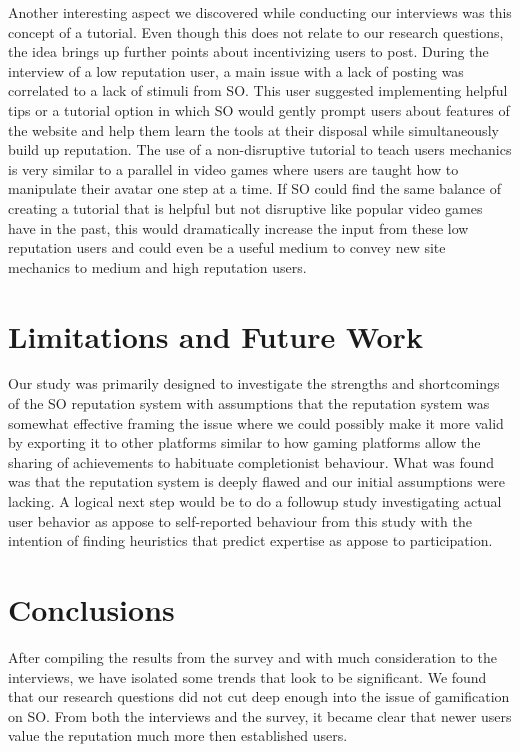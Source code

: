 \documentclass{sigchi}
\begin{document}
Another interesting aspect we discovered while conducting our interviews was this concept of a tutorial. Even though this does not relate to our research questions, the idea brings up further points about incentivizing users to post. During the interview of a low reputation user, a main issue with a lack of posting was correlated to a lack of stimuli from SO. This user suggested implementing helpful tips or a tutorial option in which SO would gently prompt users about features of the website and help them learn the tools at their disposal while simultaneously build up reputation. The use of a non-disruptive tutorial to teach users mechanics is very similar to a parallel in video games where users are taught how to manipulate their avatar one step at a time. If SO could find the same balance of creating a tutorial that is helpful but not disruptive like popular video games have in the past, this would dramatically increase the input from these low reputation users and could even be a useful medium to convey new site mechanics to medium and high reputation users.


\section{Limitations and Future Work}

Our study was primarily designed to investigate the strengths and shortcomings of the SO reputation system with assumptions that the reputation system was somewhat effective framing the issue where we could possibly make it more valid by exporting it to other platforms similar to how gaming platforms allow the sharing of achievements to habituate completionist behaviour. What was found was that the reputation system is deeply flawed and our initial assumptions were lacking. A logical next step would be to do a followup study investigating actual user behavior as appose to self-reported behaviour from this study with the intention of finding heuristics that predict expertise as appose to participation. 

\section{Conclusions}

After compiling the results from the survey and with much consideration to the interviews, we have isolated some trends that look to be significant. We found that our research questions did not cut deep enough into the issue of gamification on SO. From both the interviews and the survey, it became clear that newer users value the reputation much more then established users.
\end{document}
